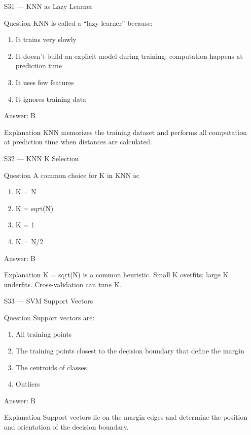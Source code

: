 \documentclass[aspectratio=169,8pt]{beamer}
\begin{document}
	\begin{frame}{S31 --- KNN as Lazy Learner}
		\begin{block}{Question}
			KNN is called a ``lazy learner'' because:
			\begin{enumerate}
				\item It trains very slowly
				\item It doesn't build an explicit model during training; computation happens at prediction time
				\item It uses few features
				\item It ignores training data
			\end{enumerate}
		\end{block}
		\begin{exampleblock}{Answer: B}\end{exampleblock}
		\begin{block}{Explanation}
			KNN memorizes the training dataset and performs all computation at prediction time when distances are calculated.
		\end{block}
	\end{frame}
	
	\begin{frame}{S32 --- KNN K Selection}
		\begin{block}{Question}
			A common choice for K in KNN is:
			\begin{enumerate}
				\item K = N
				\item K = sqrt(N)
				\item K = 1
				\item K = N/2
			\end{enumerate}
		\end{block}
		\begin{exampleblock}{Answer: B}\end{exampleblock}
		\begin{block}{Explanation}
			K = sqrt(N) is a common heuristic. Small K overfits; large K underfits. Cross-validation can tune K.
		\end{block}
	\end{frame}
	
	\begin{frame}{S33 --- SVM Support Vectors}
		\begin{block}{Question}
			Support vectors are:
			\begin{enumerate}
				\item All training points
				\item The training points closest to the decision boundary that define the margin
				\item The centroids of classes
				\item Outliers
			\end{enumerate}
		\end{block}
		\begin{exampleblock}{Answer: B}\end{exampleblock}
		\begin{block}{Explanation}
			Support vectors lie on the margin edges and determine the position and orientation of the decision boundary.
		\end{block}
	\end{frame}
	
\end{document}

